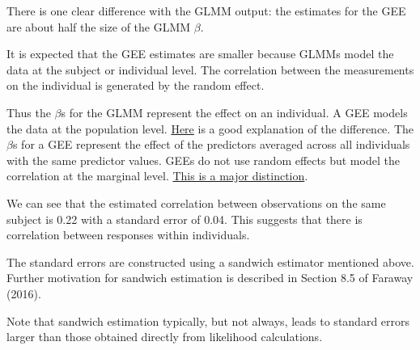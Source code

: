 \documentclass[
  ignorenonframetext,
]{beamer}
\begin{document}
\begin{frame}{}
\protect\hypertarget{section-22}{}
There is one clear difference with the GLMM output: the estimates for
the GEE are about half the size of the GLMM \(\beta\).

It is expected that the GEE estimates are smaller because GLMMs model
the data at the subject or individual level. The correlation between the
measurements on the individual is generated by the random effect.

Thus the \(\beta\)s for the GLMM represent the effect on an individual.
A GEE models the data at the population level.
\href{https://stats.stackexchange.com/questions/17331/what-is-the-difference-between-generalized-estimating-equations-and-glmm}{Here}
is a good explanation of the difference. The \(\beta\)s for a GEE
represent the effect of the predictors averaged across all individuals
with the same predictor values. GEEs do not use random effects but model
the correlation at the marginal level.
\href{https://www.jstor.org/stable/25680575?seq=1\#metadata_info_tab_contents}{This
is a major distinction}.
\end{frame}

\begin{frame}{}
\protect\hypertarget{section-23}{}
We can see that the estimated correlation between observations on the
same subject is 0.22 with a standard error of 0.04. This suggests that
there is correlation between responses within individuals.

The standard errors are constructed using a sandwich estimator mentioned
above. Further motivation for sandwich estimation is described in
Section 8.5 of Faraway (2016).

Note that sandwich estimation typically, but not always, leads to
standard errors larger than those obtained directly from likelihood
calculations.
\end{frame}
\end{document}
